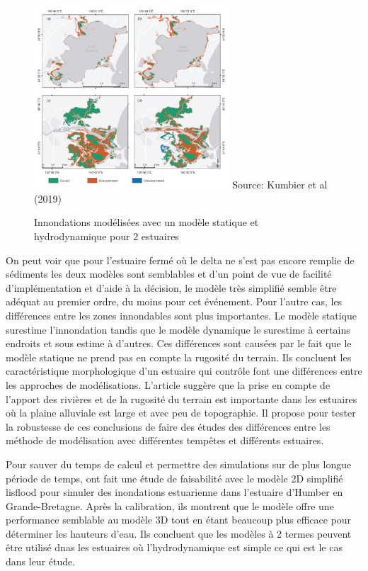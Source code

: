 \documentclass[12pt]{article}   %
\begin{document}
    \begin{figure}
        \centering
        \includegraphics[width=0.65\textwidth]{Image2_Kumbier.png}
        {\hspace{-2cm} \tiny Source: Kumbier et al (2019) }
        \caption{Innondations modélisées avec un modèle statique et hydrodynamique pour 2 estuaires}
        \label{kumbier}
    \end{figure}
    
    On peut voir que pour l'estuaire fermé où le delta ne s'est pas encore remplie de sédiments les deux modèles sont semblables et d'un point de vue de facilité d'implémentation et d'aide à la décision, le modèle très simplifié semble être adéquat au premier ordre, du moins pour cet événement. Pour l'autre cas, les différences entre les zones innondables sont plus importantes. Le modèle statique surestime l'innondation tandis que le modèle dynamique le surestime à certains endroits et sous estime à d'autres.  Ces différences sont causées par le fait que le modèle statique ne prend pas en compte la rugosité du terrain. Ils concluent les caractéristique morphologique d'un estuaire qui contrôle font une différences entre les approches de modélisations. L'article suggère que la prise en compte de l'apport des rivières et de la rugosité du terrain est importante dans les estuaires où la plaine alluviale est large et avec peu de topographie. Il propose pour tester la robustesse de ces conclusions de faire des études des différences entre les méthode de modélisation avec différentes tempêtes et différents estuaires.
    
    Pour sauver du temps de calcul et permettre des simulations sur de plus longue période de temps, \cite{Skinner2015} ont fait une étude de faisabilité avec le modèle 2D simplifié lisflood pour simuler des inondations estuarienne dans l'estuaire d'Humber en Grande-Bretagne. Après la calibration, ils montrent que le modèle offre une performance semblable au modèle 3D tout en étant beaucoup plus efficace pour déterminer les hauteurs d'eau. Ils concluent que les modèles à 2 termes peuvent être utilisé dnas les estuaires où l'hydrodynamique est simple ce qui est le cas dans leur étude. 
    
\end{document}
